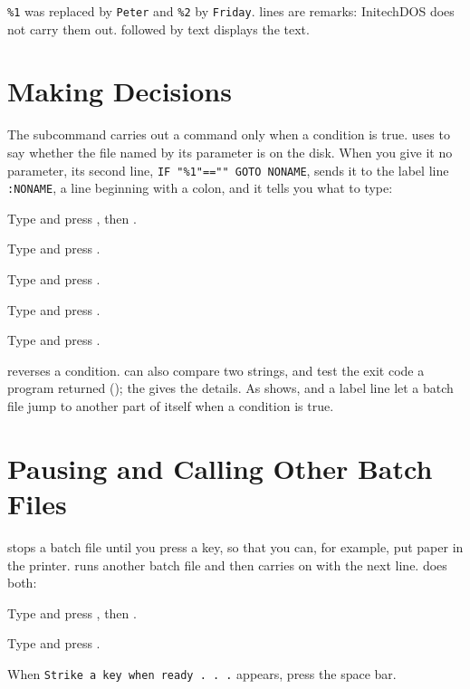 
\texttt{\%1} was replaced by \texttt{Peter} and \texttt{\%2} by
\texttt{Friday}.   lines are remarks: InitechDOS does not carry
them out.   followed by text displays the text.

\section{Making Decisions}
The  subcommand carries out a command only when a condition is
true.   uses  to say whether the file named
by its parameter is on the disk.  When you give it no parameter, its
second line, \texttt{IF "\%1"=="" GOTO NONAME}, sends it to the label line
\texttt{:NONAME}, a line beginning with a colon, and it tells you what to
type:
\begin{Steps}
\item Type  and press , then .
\item Type  and press .
\item Type  and press .
\item Type  and press .
\item Type  and press .
\end{Steps}


 reverses a condition.   can also compare two strings,
and test the exit code a program returned (); the
 gives the details.
As  shows,  and a label line let a batch file
jump to another part of itself when a condition is true.

\section{Pausing and Calling Other Batch Files}
 stops a batch file until you press a key, so that you can, for
example, put paper in the printer.   runs another batch file and
then carries on with the next line.   does both:
\begin{Steps}
\item Type  and press , then .
\item Type  and press .
\item When \texttt{Strike a key when ready . . .} appears, press the
  space bar.
\end{Steps}


